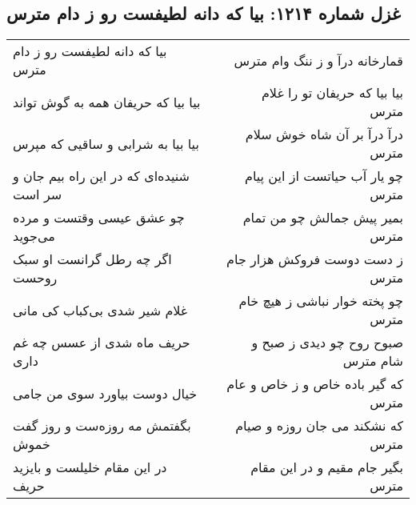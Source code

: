 \begin{center}
\section*{غزل شماره ۱۲۱۴: بیا که دانه لطیفست رو ز دام مترس}
\label{sec:1214}
\begin{longtable}{l p{0.5cm} r}
بیا که دانه لطیفست رو ز دام مترس
&&
قمارخانه درآ و ز ننگ وام مترس
\\
بیا بیا که حریفان همه به گوش تواند
&&
بیا بیا که حریفان تو را غلام مترس
\\
بیا بیا به شرابی و ساقیی که مپرس
&&
درآ درآ بر آن شاه خوش سلام مترس
\\
شنیده‌ای که در این راه بیم جان و سر است
&&
چو یار آب حیاتست از این پیام مترس
\\
چو عشق عیسی وقتست و مرده می‌جوید
&&
بمیر پیش جمالش چو من تمام مترس
\\
اگر چه رطل گرانست او سبک روحست
&&
ز دست دوست فروکش هزار جام مترس
\\
غلام شیر شدی بی‌کباب کی مانی
&&
چو پخته خوار نباشی ز هیچ خام مترس
\\
حریف ماه شدی از عسس چه غم داری
&&
صبوح روح چو دیدی ز صبح و شام مترس
\\
خیال دوست بیاورد سوی من جامی
&&
که گیر باده خاص و ز خاص و عام مترس
\\
بگفتمش مه روزه‌ست و روز گفت خموش
&&
که نشکند می جان روزه و صیام مترس
\\
در این مقام خلیلست و بایزید حریف
&&
بگیر جام مقیم و در این مقام مترس
\\
\end{longtable}
\end{center}

